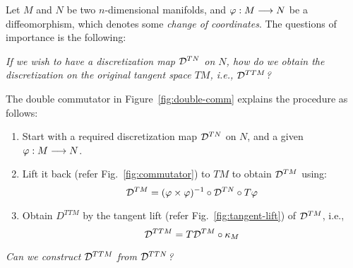 Let $M$ and $N$ be two $n$-dimensional manifolds, and $\varphi: M \longrightarrow N$ be a diffeomorphism, which denotes some \textit{change of coordinates}. The questions of importance is the following:

\textit{If we wish to have a discretization map $\mathcal{D}^{TN}$ on $N$, how do we obtain the discretization on the original tangent space $TM$, i.e., $\mathcal{D}^{TTM}$?}

The double commutator in Figure~\ref{fig:double-comm} explains the procedure as follows:

\begin{enumerate}
  \item Start with a required discretization map $\mathcal{D}^{TN}$ on $N$, and a given $\varphi: M \longrightarrow N$.
  \item Lift it back (refer Fig.~\ref{fig:commutator}) to $TM$ to obtain $\mathcal{D}^{TM}$ using: \[\mathcal{D}^{TM} = (\varphi \times \varphi)^{-1} \circ \mathcal{D}^{TN} \circ T\varphi\] 
  \item Obtain $D^{TTM}$ by the tangent lift (refer Fig.~\ref{fig:tangent-lift}) of $\mathcal{D}^{TM}$, i.e., \[\mathcal{D}^{TTM} = T\mathcal{D}^{TM} \circ \kappa_M\]
\end{enumerate}

\textit{Can we construct $\mathcal{D}^{TTM}$ from $\mathcal{D}^{TTN}$?}

